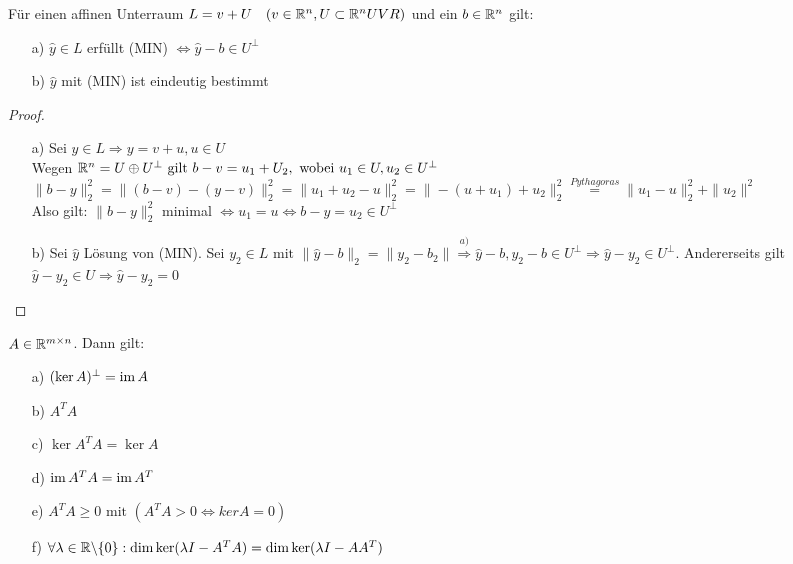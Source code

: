 \begin{Satz}
Für einen affinen Unterraum $L=v+U\quad(v\in \mathbb R^n, U\subset \mathbb R^n UVR)$ und ein $b\in \mathbb R^n$ gilt:\\
\begin{itemize}
\item[a)]$\hat{y} \in L$ erfüllt (MIN) $\Leftrightarrow \hat{y}-b\in U^{\perp}$
\item[b)]$\hat{y}$ mit (MIN) ist eindeutig bestimmt
\end{itemize}
\end{Satz}
\begin{proof}\hfill
\begin{itemize}
\item[a)] Sei $y \in L \Rightarrow y=v+u, u\in U$\\Wegen $\mathbb R^n=U \oplus U^{\perp} \text{ gilt } b-v=u_1+U_2, \text{ wobei } u_1\in U, u_2 \in U^{\perp}$\\
$\|b-y\|_2^{2} =\|(b-v)-(y-v)\|_2^{2}=\|u_1+u_2-u\|_2^{2}=\|-(u+u_1)+u_2\|_2^{2} \overset{Pythagoras}{=}\|u_1-u\|_2^{2} + \|u_2\|^{2}$\\
Also gilt: $\|b-y\|_2^{2}$ minimal $\Leftrightarrow u_1=u \Leftrightarrow b-y = u_2 \in U^{\perp}$\\
\item[b)] Sei $\hat{y}$ Lösung von (MIN). Sei $y_2 \in L \text{ mit }\|\hat{y}-b\|_2 =\|y_2-b_2\| \overset{a)}{\Rightarrow} \hat{y}-b,y_2-b \in U^{\perp} \Rightarrow \hat{y}-y_2 \in U^{\perp}$.
Andererseits gilt $\hat{y}-y_2 \in U \Rightarrow \hat{y}-y_2=0$
\end{itemize}
\end{proof}
\begin{Satz}
$A \in \mathbb R^{m \times n}$. Dann gilt:\\\begin{itemize}
\item[a)]$(\ker A)^{\perp} = \operatorname*{\mathrm{im}} A$ \quad {}
\item[b)]$A^TA$\; 
\item[c)]$\ker A^TA = \ker A$
\item[d)]$\operatorname*{\mathrm{im}} A^TA = \operatorname*{\mathrm{im}} A^T$
\item[e)]$A^TA \ge 0 \text{ mit } (A^TA>0 \Leftrightarrow ker A = {0})$
\item[f)] $\forall \lambda \in \mathbb R\backslash\{0\}: \dim \ker(\lambda I-A^TA) = \dim \ker(\lambda I-AA^T)$
\end{itemize}
\end{Satz}

